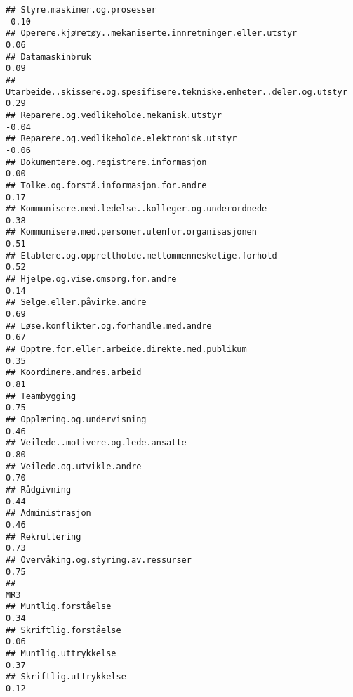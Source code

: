 \documentclass[
]{article}
\begin{document}
\begin{verbatim}
## Styre.maskiner.og.prosesser                                                      -0.10
## Operere.kjøretøy..mekaniserte.innretninger.eller.utstyr                           0.06
## Datamaskinbruk                                                                    0.09
## Utarbeide..skissere.og.spesifisere.tekniske.enheter..deler.og.utstyr              0.29
## Reparere.og.vedlikeholde.mekanisk.utstyr                                         -0.04
## Reparere.og.vedlikeholde.elektronisk.utstyr                                      -0.06
## Dokumentere.og.registrere.informasjon                                             0.00
## Tolke.og.forstå.informasjon.for.andre                                             0.17
## Kommunisere.med.ledelse..kolleger.og.underordnede                                 0.38
## Kommunisere.med.personer.utenfor.organisasjonen                                   0.51
## Etablere.og.opprettholde.mellommenneskelige.forhold                               0.52
## Hjelpe.og.vise.omsorg.for.andre                                                   0.14
## Selge.eller.påvirke.andre                                                         0.69
## Løse.konflikter.og.forhandle.med.andre                                            0.67
## Opptre.for.eller.arbeide.direkte.med.publikum                                     0.35
## Koordinere.andres.arbeid                                                          0.81
## Teambygging                                                                       0.75
## Opplæring.og.undervisning                                                         0.46
## Veilede..motivere.og.lede.ansatte                                                 0.80
## Veilede.og.utvikle.andre                                                          0.70
## Rådgivning                                                                        0.44
## Administrasjon                                                                    0.46
## Rekruttering                                                                      0.73
## Overvåking.og.styring.av.ressurser                                                0.75
##                                                                                    MR3
## Muntlig.forståelse                                                                0.34
## Skriftlig.forståelse                                                              0.06
## Muntlig.uttrykkelse                                                               0.37
## Skriftlig.uttrykkelse                                                             0.12

\end{verbatim}
\end{document}
